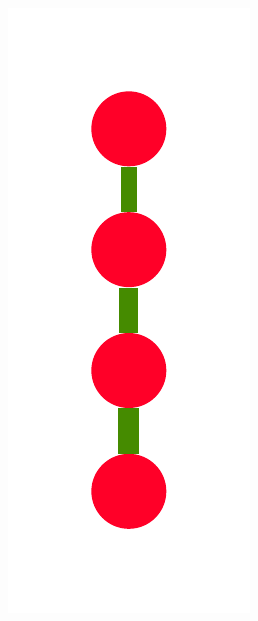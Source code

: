 \documentclass[a4paper,10pt]{article}
\begin{document}
\begin{figure}
{    \includegraphics[scale=.14]{./figures/6-3-recursion-data-7.pdf}
}
\end{figure}
\end{document}
